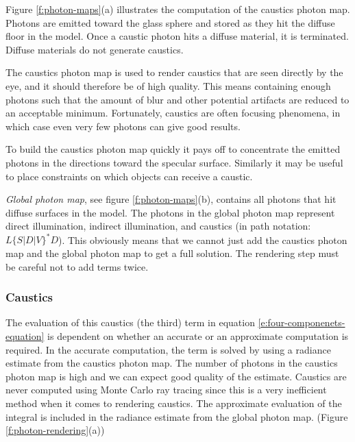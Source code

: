 Figure \ref{f:photon-maps}(a) illustrates the computation of the caustics photon map. Photons are emitted toward the glass sphere and stored as they hit the diffuse floor in the model. Once a caustic photon hits a diffuse material, it is terminated. Diffuse materials do not generate caustics.

The caustics photon map is used to render caustics that are seen directly by the eye, and it should therefore be of high quality. This means containing enough photons such that the amount of blur and other potential artifacts are reduced to an acceptable minimum. Fortunately, caustics are often focusing phenomena, in which case even very few photons can give good results.

To build the caustics photon map quickly it pays off to concentrate the emitted photons in the directions toward the specular surface. Similarly it may be useful to place constraints on which objects can receive a caustic.

\textit{Global photon map}, see figure \ref{f:photon-maps}(b), contains all photons that hit diffuse surfaces in the model. The photons in the global photon map represent direct illumination, indirect illumination, and caustics (in path notation: $L\{S|D|V\}^{*}D$). This obviously means that we cannot just add the caustics photon map and the global photon map to get a full solution. The rendering step must be careful not to add terms twice.



\subsubsection{Caustics}
The evaluation of this caustics (the third) term in equation \ref{e:four-componenets-equation} is dependent on whether an accurate or an approximate computation is required. In the accurate computation, the term is solved by using a radiance estimate from the caustics photon map. The number of photons in the caustics photon map is high and we can expect good quality of the estimate. Caustics are never computed using Monte Carlo ray tracing since this is a very inefficient method when it comes to rendering caustics. The approximate evaluation of the integral is included in the radiance estimate from the global photon map. (Figure \ref{f:photon-rendering}(a))

